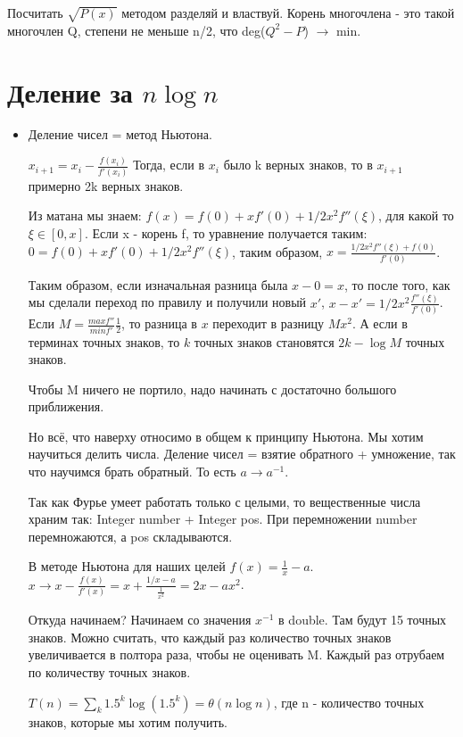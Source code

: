 Посчитать $\sqrt{P(x)}$ методом разделяй и властвуй. Корень многочлена - это такой многочлен Q, степени не меньше n/2, что deg($Q^2 - P$) $\rightarrow$ min.

\section{Деление за \texorpdfstring{$n\log n$}{n log n}}

\begin{itemize}
	\item Деление чисел = метод Ньютона.
	
	$x_{i + 1} = x_i - \frac{f(x_i)}{f'(x_i)}$ Тогда, если в $x_i$ было k верных знаков, то в $x_{i + 1}$ примерно 2k верных знаков.
	
	Из матана мы знаем: $f(x) = f(0) + xf'(0) + 1/2x^2f''(\xi)$, для какой то $\xi \in [0, x]$. Если x - корень f, то уравнение получается таким: $0 = f(0) + xf'(0) + 1/2x^2f''(\xi)$, таким образом, $x = \frac{1/2x^2f''(\xi) + f(0)}{f'(0)}$.
	
	Таким образом, если изначальная разница была $x - 0 = x$, то после того, как мы сделали переход по правилу и получили новый $x'$, $x - x' = 1/2x^2\frac{f''(\xi)}{f'(0)}$. Если $M = \frac{max f''}{min f'}\frac{1}{2}$, то разница в $x$ переходит в разницу $Mx^2$. А если в терминах точных знаков, то $k$ точных знаков становятся $2k - \log M$ точных знаков. 
	
	Чтобы M ничего не портило, надо начинать с достаточно большого приближения.
	
	Но всё, что наверху относимо в общем к принципу Ньютона. Мы хотим научиться делить числа. Деление чисел = взятие обратного + умножение, так что научимся брать обратный. То есть $a \rightarrow a^{-1}$.
	
	Так как Фурье умеет работать только с целыми, то вещественные числа храним так: Integer number + Integer pos. При перемножении number перемножаются, а pos складываются.
	
	В методе Ньютона для наших целей $f(x) = \frac{1}{x} - a$. $x \rightarrow x - \frac{f(x)}{f'(x)} = x + \frac{1/x - a}{\frac{1}{x^2}} = 2x - ax^2$.
	
	Откуда начинаем? Начинаем со значения $x^{-1}$ в double. Там будут 15 точных знаков. Можно считать, что каждый раз количество точных знаков увеличивается в полтора раза, чтобы не оценивать M. Каждый раз отрубаем по количеству точных знаков.
	
	$T(n) = \sum\limits_{k} 1.5^k\log(1.5^k) = \theta(n \log n)$, где n - количество точных знаков, которые мы хотим получить.
	

\end{itemize}
